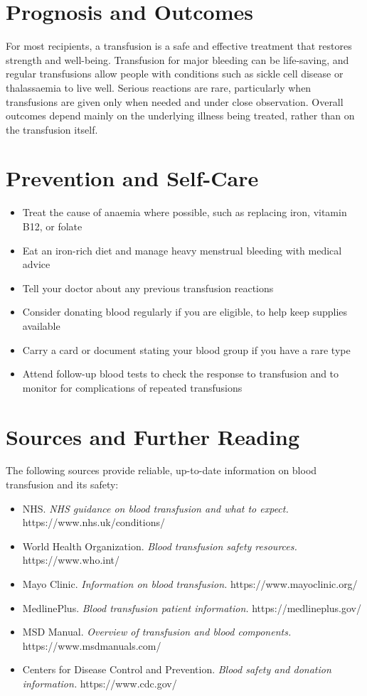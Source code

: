 \section*{Prognosis and Outcomes}
For most recipients, a transfusion is a safe and effective treatment that restores strength and well-being. Transfusion for major bleeding can be life-saving, and regular transfusions allow people with conditions such as sickle cell disease or thalassaemia to live well. Serious reactions are rare, particularly when transfusions are given only when needed and under close observation. Overall outcomes depend mainly on the underlying illness being treated, rather than on the transfusion itself.

\section*{Prevention and Self-Care}
\begin{itemize}
    \item Treat the cause of anaemia where possible, such as replacing iron, vitamin B12, or folate
    \item Eat an iron-rich diet and manage heavy menstrual bleeding with medical advice
    \item Tell your doctor about any previous transfusion reactions
    \item Consider donating blood regularly if you are eligible, to help keep supplies available
    \item Carry a card or document stating your blood group if you have a rare type
    \item Attend follow-up blood tests to check the response to transfusion and to monitor for complications of repeated transfusions
\end{itemize}

\section*{Sources and Further Reading}
The following sources provide reliable, up-to-date information on blood transfusion and its safety:

\begin{itemize}
    \item NHS. \textit{NHS guidance on blood transfusion and what to expect.} https://www.nhs.uk/conditions/
    \item World Health Organization. \textit{Blood transfusion safety resources.} https://www.who.int/
    \item Mayo Clinic. \textit{Information on blood transfusion.} https://www.mayoclinic.org/
    \item MedlinePlus. \textit{Blood transfusion patient information.} https://medlineplus.gov/
    \item MSD Manual. \textit{Overview of transfusion and blood components.} https://www.msdmanuals.com/
    \item Centers for Disease Control and Prevention. \textit{Blood safety and donation information.} https://www.cdc.gov/
\end{itemize}
